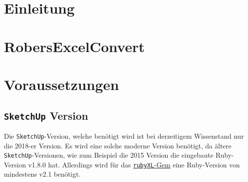 \documentclass{book}
\newcommand{\sketchup}{\texttt{SketchUp}\xspace}
\newcommand{\rubyXL}{\texttt{rubyXL}\xspace}
\begin{document}
	
	
	
	\tableofcontents
	\chapter{Einleitung}
	
	\chapter{RobersExcelConvert}
	\chapter{Voraussetzungen}
		\section{\sketchup Version}
			Die \sketchup-Version, welche benötigt wird ist bei derzeitigem Wissenstand nur die 2018-er Version. Es wird eine solche moderne Version benötigt, da ältere \sketchup-Versionen, wie zum Beispiel die 2015 Version die eingebaute Ruby-Version v1.8.0 hat. Allerdings wird für das \hyperref[rubyXL]{\rubyXL-Gem} eine Ruby-Version von mindestens v2.1 benötigt.
\end{document}
